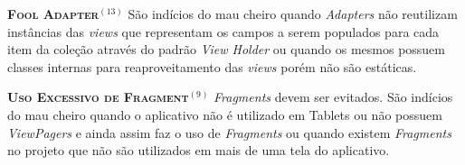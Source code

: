 
  \noindent
  \textsc{\textbf{{\small Fool Adapter}}}$^{(13)}$ São indícios do mau cheiro quando \textit{Adapters} não reutilizam instâncias das \textit{views} que representam os campos a serem populados para cada item da coleção através do padrão \textit{View Holder} ou quando os mesmos possuem classes internas para reaproveitamento das \textit{views} porém não são estáticas.






  \noindent
  \textsc{\textbf{{\small Uso Excessivo de Fragment}}}$^{(9)}$ \textit{Fragments} devem ser evitados. São indícios do mau cheiro quando o aplicativo não é utilizado em Tablets ou não possuem \textit{ViewPagers} e ainda assim faz o uso de \textit{Fragments} ou quando existem \textit{Fragments} no projeto que não são utilizados em mais de uma tela do aplicativo.

